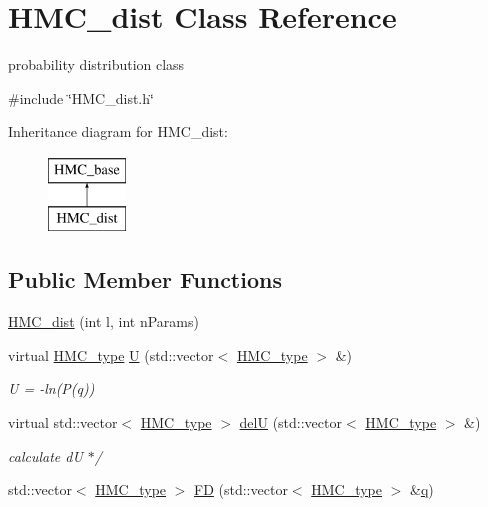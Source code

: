 \hypertarget{class_h_m_c__dist}{\section{H\-M\-C\-\_\-dist Class Reference}
\label{class_h_m_c__dist}
}


probability distribution class  




{\ttfamily \#include \char`\"{}H\-M\-C\-\_\-dist.\-h\char`\"{}}

Inheritance diagram for H\-M\-C\-\_\-dist\-:\begin{figure}[H]
\begin{center}
\leavevmode
\includegraphics[height=2.000000cm]{class_h_m_c__dist}
\end{center}
\end{figure}
\subsection*{Public Member Functions}
\begin{DoxyCompactItemize}
\item 
\hyperlink{class_h_m_c__dist_a62e12ed5444505af3ffae0e6971845e2}{H\-M\-C\-\_\-dist} (int l, int n\-Params)
\item 
virtual \hyperlink{define__type_8h_a9adf655d34223b34db3baff5c7ce420c}{H\-M\-C\-\_\-type} \hyperlink{class_h_m_c__dist_ab536db252ec2926399e030b576a47f22}{U} (std\-::vector$<$ \hyperlink{define__type_8h_a9adf655d34223b34db3baff5c7ce420c}{H\-M\-C\-\_\-type} $>$ \&)
\begin{DoxyCompactList}\small\item\em U = -\/ln(P(q)) \end{DoxyCompactList}\item 
virtual std\-::vector$<$ \hyperlink{define__type_8h_a9adf655d34223b34db3baff5c7ce420c}{H\-M\-C\-\_\-type} $>$ \hyperlink{class_h_m_c__dist_a0fdfe885bac1033a4cccc8442b225937}{del\-U} (std\-::vector$<$ \hyperlink{define__type_8h_a9adf655d34223b34db3baff5c7ce420c}{H\-M\-C\-\_\-type} $>$ \&)
\begin{DoxyCompactList}\small\item\em calculate d\-U $\ast$/ \end{DoxyCompactList}\item 
std\-::vector$<$ \hyperlink{define__type_8h_a9adf655d34223b34db3baff5c7ce420c}{H\-M\-C\-\_\-type} $>$ \hyperlink{class_h_m_c__dist_adf7687e9feb76025e5cd3095c357cc10}{F\-D} (std\-::vector$<$ \hyperlink{define__type_8h_a9adf655d34223b34db3baff5c7ce420c}{H\-M\-C\-\_\-type} $>$ \&\hyperlink{class_h_m_c__base_a9cb5e5ac7774b066976e6e9cac0dbfe8}{q})
\end{DoxyCompactItemize}


